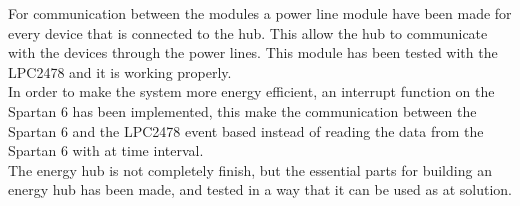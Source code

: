 For communication between the modules a power line module have been made for every device that is connected to the hub. This allow the hub to communicate with the devices through the power lines. This module has been tested with the LPC2478 and it is working properly.\\
In order to make the system more energy efficient, an interrupt function on the Spartan 6 has been implemented, this make the communication between the Spartan 6 and the LPC2478 event based instead of reading the data from the Spartan 6 with at time interval.\\
The energy hub is not completely finish, but the essential parts for building an energy hub has been made, and tested in a way that it can be used as at solution.
